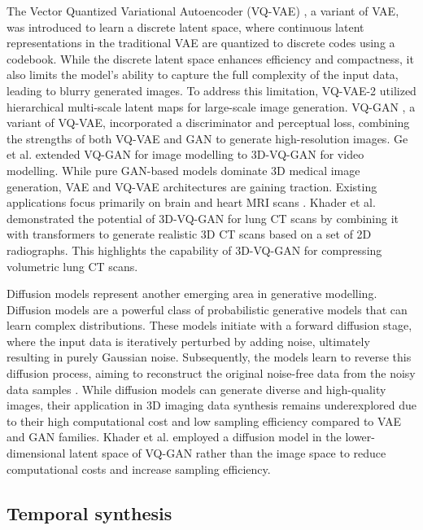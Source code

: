 The Vector Quantized Variational Autoencoder (VQ-VAE) \cite{van2017neural}, a variant of VAE, was introduced to learn a discrete latent space, where continuous latent representations in the traditional VAE are quantized to discrete codes using a codebook. While the discrete latent space enhances efficiency and compactness, it also limits the model's ability to capture the full complexity of the input data, leading to blurry generated images. To address this limitation, VQ-VAE-2 \cite{razavi2019generating} utilized hierarchical multi-scale latent maps for large-scale image generation. VQ-GAN \cite{esser2021taming}, a variant of VQ-VAE, incorporated a discriminator and perceptual loss, combining the strengths of both VQ-VAE and GAN to generate high-resolution images. Ge et al. \cite{ge2022long} extended VQ-GAN for image modelling to 3D-VQ-GAN for video modelling. While pure GAN-based models dominate 3D medical image generation, VAE and VQ-VAE architectures are gaining traction. Existing applications focus primarily on brain and heart MRI scans \cite{liu20243d,tudosiu2020neuromorphologicaly}. Khader et al. \cite{khader2023transformers} demonstrated the potential of 3D-VQ-GAN for lung CT scans by combining it with transformers to generate realistic 3D CT scans based on a set of 2D radiographs. This highlights the capability of 3D-VQ-GAN for compressing volumetric lung CT scans.

Diffusion models \cite{ho2020denoising,croitoru2023diffusion} represent another emerging area in generative modelling. Diffusion models are a powerful class of probabilistic generative models that can learn complex distributions. These models initiate with a forward diffusion stage, where the input data is iteratively perturbed by adding noise, ultimately resulting in purely Gaussian noise. Subsequently, the models learn to reverse this diffusion process, aiming to reconstruct the original noise-free data from the noisy data samples \cite{kazerouni2023diffusion}. While diffusion models can generate diverse and high-quality images, their application in 3D imaging data synthesis remains underexplored due to their high computational cost and low sampling efficiency compared to VAE and GAN families. Khader et al. \cite{khader2022medical} employed a diffusion model in the lower-dimensional latent space of VQ-GAN rather than the image space to reduce computational costs and increase sampling efficiency.


\subsection{Temporal synthesis} 

